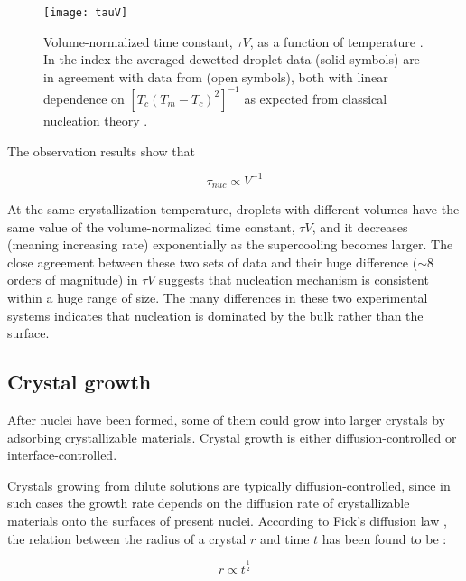 \begin{figure}[H]
\center
\texttt{[image: tauV]}
\caption[Volume-normalized time constant, $\tau V$, as a function of temperature.]{Volume-normalized time constant, $\tau V$, as a function of temperature \cite{Massa2004}. In the index the averaged dewetted droplet data (solid symbols) are in agreement with data from \cite{Rottele2003} (open symbols), both with linear dependence on $[T_{c}(T_{m}-T_{c})^{2}]^{-1}$ as expected from classical nucleation theory \cite{Strobl2007}.}
\label{fig:tauV}
\end{figure}

The observation results show that

\begin{equation}
\label{eqn_nucleation time}
\tau _{nuc} \propto V^{-1}
\end{equation}

At the same crystallization temperature, droplets with different volumes have the same value of the volume-normalized time constant, $\tau V$, and it decreases (meaning increasing rate) exponentially as the supercooling becomes larger. The close agreement between these two sets of data and their huge difference ($\sim 8$ orders of magnitude) in $\tau V$ suggests that nucleation mechanism is consistent within a huge range of size. The many differences in these two experimental systems indicates that nucleation is dominated by the bulk rather than the surface.

\subsection{Crystal growth}

After nuclei have been formed, some of them could grow into larger crystals by adsorbing crystallizable materials. Crystal growth is either diffusion-controlled or interface-controlled.

Crystals growing from dilute solutions are typically diffusion-controlled, since in such cases the growth rate depends on the diffusion rate of crystallizable materials onto the surfaces of present nuclei. According to Fick's diffusion law \cite{Fick1855,FickZiirich1995}, the relation between the radius of a crystal $r$ and time $t$ has been found to be \cite{Ouyang1998,Ouyang1999,HaoOuyang2004,Naga2013}:

\begin{equation}
\label{eqn_diffusion crystal radius}
r \propto t^{\frac{1}{2}}
\end{equation}

